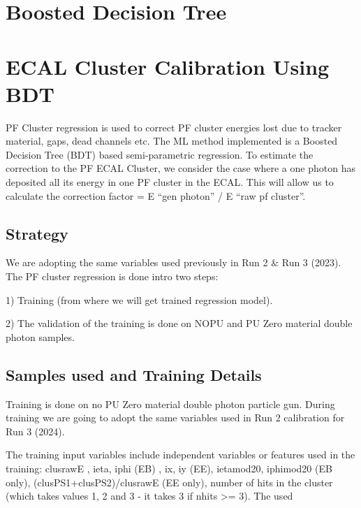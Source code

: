 
\section{Boosted Decision Tree}
\section{ECAL Cluster Calibration Using BDT}

PF Cluster regression is used to correct PF cluster energies lost due to tracker material, gaps, dead channels etc. The ML method implemented is a Boosted Decision Tree (BDT) based semi-parametric regression. To estimate the correction to the PF ECAL Cluster, we consider the case where a one photon has deposited all its energy in one PF cluster in the ECAL. This will allow us to calculate the correction factor = E “gen photon” / E “raw pf cluster”. 

\subsection{Strategy}

We are adopting the same variables used previously in Run 2 & Run 3 (2023). The PF cluster regression is done intro two steps:  

1) Training (from where we will get trained regression model). 

2) The validation of the training is done on NOPU and PU Zero material double photon samples.

\subsection{Samples used and Training Details}

Training is done on no PU Zero material double photon particle gun. During training we are going to adopt the same variables used in Run 2 calibration for Run 3 (2024). 

The training input variables include independent variables or features used in the training:  
	clusrawE , ieta, iphi (EB) , ix, iy (EE), ietamod20, iphimod20 (EB only), (clusPS1+clusPS2)/clusrawE (EE only), number of hits in the cluster (which takes values 1, 2 and 3 - it takes 3 if nhits >= 3). The used  

